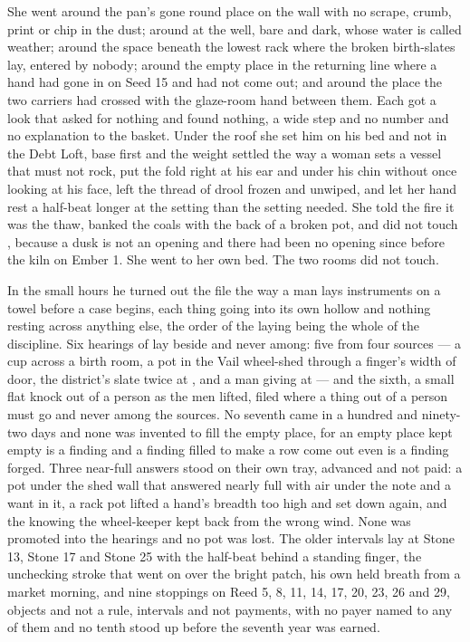 She went around the pan's gone round place on the wall with no scrape, crumb, print or chip in the dust; around  at the well, bare and dark, whose water is called weather; around the space beneath the lowest rack where the broken birth-slates lay, entered by nobody; around the empty place in the returning line where a hand had gone in on Seed 15 and had not come out; and around the place the two carriers had crossed with the glaze-room hand between them. Each got a look that asked for nothing and found nothing, a wide step and no number and no explanation to the basket. Under the roof she set him on his bed and not in the Debt Loft, base first and the weight settled the way a woman sets a vessel that must not rock, put the fold right at his ear and under his chin without once looking at his face, left the thread of drool frozen and unwiped, and let her hand rest a half-beat longer at the setting than the setting needed. She told the fire it was the thaw, banked the coals with the back of a broken pot, and did not touch , because a dusk is not an opening and there had been no opening since before the kiln on Ember 1. She went to her own bed. The two rooms did not touch.

\scenebreak

In the small hours he turned out the file the way a man lays instruments on a towel before a case begins, each thing going into its own hollow and nothing resting across anything else, the order of the laying being the whole of the discipline. Six hearings of  lay beside and never among: five from four sources --- a cup across a birth room, a pot in the Vail wheel-shed through a finger's width of door, the district's slate twice at , and a man giving at  --- and the sixth, a small flat knock out of a person as the men lifted, filed where a thing out of a person must go and never among the sources. No seventh came in a hundred and ninety-two days and none was invented to fill the empty place, for an empty place kept empty is a finding and a finding filled to make a row come out even is a finding forged. Three near-full answers stood on their own tray, advanced and not paid: a pot under the shed wall that answered nearly full with air under the note and a want in it, a rack pot lifted a hand's breadth too high and set down again, and the knowing the wheel-keeper kept back from the wrong wind. None was promoted into the hearings and no pot was lost. The older intervals lay at Stone 13, Stone 17 and Stone 25 with the half-beat behind a standing finger, the unchecking stroke that went on over the bright patch, his own held breath from a market morning, and nine stoppings on Reed 5, 8, 11, 14, 17, 20, 23, 26 and 29, objects and not a rule, intervals and not payments, with no payer named to any of them and no tenth stood up before the seventh year was earned.


